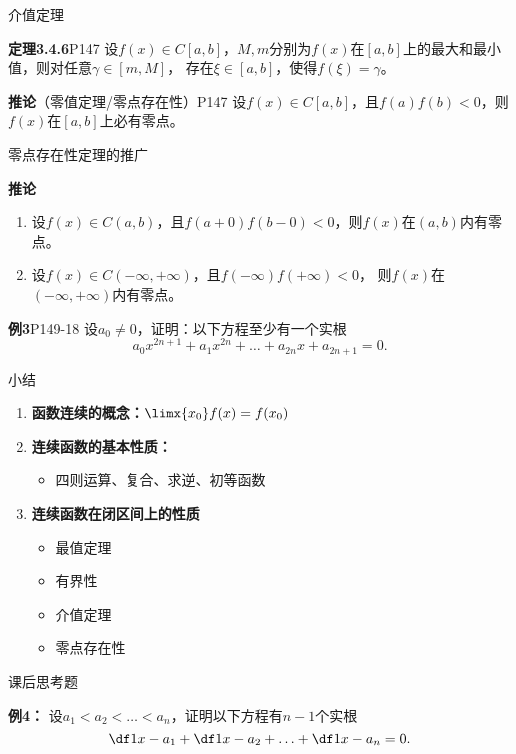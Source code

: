 \begin{frame}{介值定理}
	\linespread{1.5}\pause 
	\begin{block}{{\bf 定理3.4.6}\hfill P147}
		设$f(x)\in C[a,b]$，$M,m$分别为$f(x)$在$[a,b]$上的最大和最小值，则对任意$\gamma\in[m,M]$，
		存在$\xi\in[a,b]$，使得$f(\xi)=\gamma$。
	\end{block}\pause 
	\begin{block}{{\bf 推论}（零值定理/零点存在性）\hfill P147}
		设$f(x)\in C[a,b]$，且$f(a)f(b)<0$，则$f(x)$在$[a,b]$上必有零点。
	\end{block}
\end{frame}

\begin{frame}{零点存在性定理的推广}
	\linespread{1.2}\pause 
	\begin{block}{{\bf 推论}\hfill}
		\begin{enumerate}
		  \item 设$f(x)\in C(a,b)$，且$f(a+0)f(b-0)<0$，则$f(x)$在$(a,b)$内有零点。\pause 
		  \item 设$f(x)\in C(-\infty,+\infty)$，且$f(-\infty)f(+\infty)<0$，
		  则$f(x)$在$(-\infty,+\infty)$内有零点。
		\end{enumerate}
	\end{block}\pause 
	\begin{exampleblock}{{\bf 例3}\hfill P149-18}
		设$a_0\ne 0$，证明：以下方程至少有一个实根
		$$a_0x^{2n+1}+a_1x^{2n}+\ldots+a_{2n}x+a_{2n+1}=0.$$
	\end{exampleblock}
\end{frame}

\begin{frame}[<+->]{小结}
	\linespread{1.5}
	\begin{enumerate}
	  \item {\bf 函数连续的概念：}$\limx{x_0}f(x)=f(x_0)$
	  \item {\bf 连续函数的基本性质：}
	  \begin{itemize}
	    \item 四则运算、复合、求逆、初等函数
	  \end{itemize}
	  \item {\bf 连续函数在闭区间上的性质}
	  \begin{itemize}
	    \item 最值定理
	    \item 有界性
	    \item 介值定理
	    \item 零点存在性
	  \end{itemize}
	\end{enumerate}
\end{frame}


\begin{frame}{课后思考题}
	\linespread{1.2}
	\begin{exampleblock}{{\bf 例4：}\hfill}
		设$a_1<a_2<\ldots<a_n$，证明以下方程有$n-1$个实根
		$$\df 1{x-a_1}+\df 1{x-a_2}+\ldots+\df 1{x-a_n}=0.$$
	\end{exampleblock}
\end{frame}